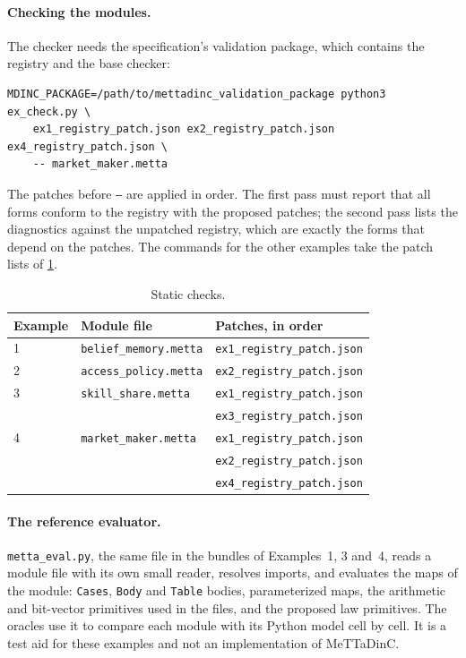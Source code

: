 \documentclass[11pt]{article}
\newcommand{\fpath}[1]{\nolinkurl{#1}}
\newcommand{\code}[1]{\texttt{#1}}
\theoremstyle{definition}
\theoremstyle{plain}
\begin{document}
\paragraph{Checking the modules.} The checker needs the specification's validation package, which
contains the registry and the base checker:
\begin{lstlisting}
MDINC_PACKAGE=/path/to/mettadinc_validation_package python3 ex_check.py \
    ex1_registry_patch.json ex2_registry_patch.json ex4_registry_patch.json \
    -- market_maker.metta
\end{lstlisting}
The patches before \code{--} are applied in order. The first pass must report that all forms conform to
the registry with the proposed patches; the second pass lists the diagnostics against the unpatched
registry, which are exactly the forms that depend on the patches. The commands for the other examples
take the patch lists of \cref{tab:repro}.

\begin{table}[ht]
\centering\small
\begin{tabular}{lll}
\toprule
Example & Module file & Patches, in order\\
\midrule
1 & \fpath{belief_memory.metta} & \fpath{ex1_registry_patch.json}\\
2 & \fpath{access_policy.metta} & \fpath{ex2_registry_patch.json}\\
3 & \fpath{skill_share.metta} & \fpath{ex1_registry_patch.json}\\
  &                             & \fpath{ex3_registry_patch.json}\\
4 & \fpath{market_maker.metta} & \fpath{ex1_registry_patch.json}\\
  &                             & \fpath{ex2_registry_patch.json}\\
  &                             & \fpath{ex4_registry_patch.json}\\
\bottomrule
\end{tabular}
\caption{Static checks.}\label{tab:repro}
\end{table}

\paragraph{The reference evaluator.} \fpath{metta_eval.py}, the same file in the bundles of
Examples~1, 3 and~4, reads a module file with its own small reader, resolves imports, and evaluates the
maps of the module: \code{Cases}, \code{Body} and \code{Table} bodies, parameterized maps, the
arithmetic and bit-vector primitives used in the files, and the proposed law primitives. The oracles use
it to compare each module with its Python model cell by cell. It is a test aid for these examples and
not an implementation of MeTTaDinC.
\end{document}
